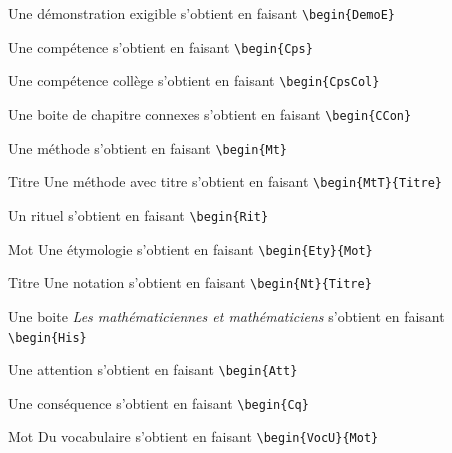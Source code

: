 \begin{pageCours}
\begin{DemoE}
Une démonstration exigible s'obtient en faisant \verb|\begin{DemoE}|
\end{DemoE}

\begin{Cps}
Une compétence s'obtient en faisant \verb|\begin{Cps}|
\end{Cps}

\begin{CpsCol}
Une compétence collège s'obtient en faisant \verb|\begin{CpsCol}|
\end{CpsCol}

\begin{CCon}
Une boite de chapitre connexes s'obtient en faisant \verb|\begin{CCon}|
\end{CCon}

\begin{Mt}
Une méthode s'obtient en faisant \verb|\begin{Mt}|
\end{Mt}

\begin{MtT}{Titre}
Une méthode avec titre s'obtient en faisant \verb|\begin{MtT}{Titre}|
\end{MtT}

\begin{Rit}
Un rituel s'obtient en faisant \verb|\begin{Rit}|
\end{Rit}

\begin{Ety}{Mot}
Une étymologie s'obtient en faisant \verb|\begin{Ety}{Mot}|
\end{Ety}

\begin{Nt}{Titre}
Une notation s'obtient en faisant \verb|\begin{Nt}{Titre}|
\end{Nt}

\begin{His}
Une boite \textit{Les mathématiciennes et mathématiciens} s'obtient en faisant \verb|\begin{His}|
\end{His}

\begin{Att}
Une attention s'obtient en faisant \verb|\begin{Att}|
\end{Att}

\begin{Cq}
Une conséquence s'obtient en faisant \verb|\begin{Cq}|
\end{Cq}

\begin{VocU}{Mot}
Du vocabulaire s'obtient en faisant \verb|\begin{VocU}{Mot}|
\end{VocU}

\end{pageCours}

